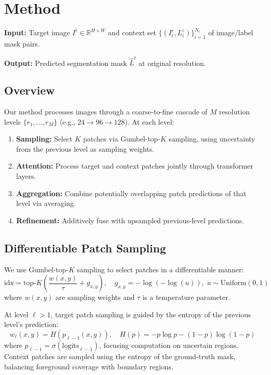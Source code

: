 \documentclass[runningheads]{llncs}
\begin{document}
\section{Method}

\noindent \textbf{Input:} Target image $I^t \in \mathbb{R}^{H \times W}$ and context set $\{(I^c_i, L^c_i)\}_{i=1}^{N_c}$ of image/label mask pairs.

\noindent \textbf{Output:} Predicted segmentation mask $\hat{L}^t$ at original resolution.

\subsection{Overview}

Our method processes images through a coarse-to-fine cascade of $M$ resolution levels $\{r_1, \ldots, r_M\}$ (e.g., $24 \rightarrow 96 \rightarrow 128$). At each level:
\begin{enumerate}
    \item \textbf{Sampling:} Select $K$ patches via Gumbel-top-$K$ sampling, using uncertainty from the previous level as sampling weights.
    \item \textbf{Attention:} Process target and context patches jointly through transformer layers.
    \item \textbf{Aggregation:} Combine potentially overlapping patch predictions of that level via averaging.
    \item \textbf{Refinement:} Additively fuse with upsampled previous-level predictions.
\end{enumerate}

\subsection{Differentiable Patch Sampling}

We use Gumbel-top-$K$ sampling to select patches in a differentiable manner:
\begin{equation}
    \text{idx} = \text{top-}K\left(\frac{w(x,y)}{\tau} + g_{x,y}\right), \quad g_{x,y} = -\log(-\log(u)), \; u \sim \text{Uniform}(0,1)
\end{equation}
where $w(x,y)$ are sampling weights and $\tau$ is a temperature parameter.

At level $\ell > 1$, target patch sampling is guided by the entropy of the previous level's prediction:
\begin{equation}
    w_\ell(x, y) = H(p_{\ell-1}(x,y)), \quad H(p) = -p\log p - (1-p)\log(1-p)
\end{equation}
where $p_{\ell-1} = \sigma(\text{logits}_{\ell-1})$, focusing computation on uncertain regions. Context patches are sampled using the entropy of the ground-truth mask, balancing foreground coverage with boundary regions.
\end{document}
